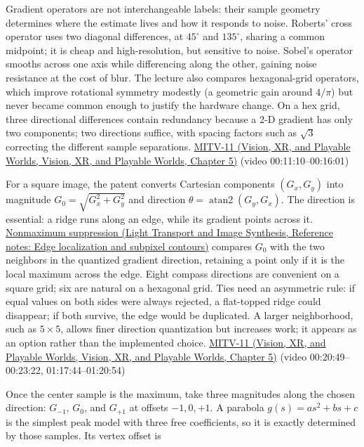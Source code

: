 Gradient operators are not interchangeable labels: their sample geometry determines where the estimate lives and how it responds to noise. Roberts' cross operator uses two diagonal differences, at \(45^\circ\) and \(135^\circ\), sharing a common midpoint; it is cheap and high-resolution, but sensitive to noise. Sobel's operator smooths across one axis while differencing along the other, gaining noise resistance at the cost of blur. The lecture also compares hexagonal-grid operators, which improve rotational symmetry modestly (a geometric gain around \(4/\pi\)) but never became common enough to justify the hardware change. On a hex grid, three directional differences contain redundancy because a 2-D gradient has only two components; two directions suffice, with spacing factors such as \(\sqrt3\) correcting the different sample separations. \href{../07-Vision-XR-and-Playable-Worlds/main.pdf\#nameddest=04-visual-computing-ii-ch036-mitv-11---edge-detection-subpixel-position-cordic-line-detection-us-6408109}{MITV-11 (Vision, XR, and Playable Worlds, Vision, XR, and Playable Worlds, Chapter 5)} (video 00:11:10--00:16:01)

For a square image, the patent converts Cartesian components \((G_x,G_y)\) into magnitude \(G_0=\sqrt{G_x^2+G_y^2}\) and direction \(\theta=\operatorname{atan2}(G_y,G_x)\). The direction is essential: a ridge runs along an edge, while its gradient points across it. \href{../04-Light-Transport-and-Image-Synthesis/main.pdf\#nameddest=appendix-36022286b03e}{Nonmaximum suppression (Light Transport and Image Synthesis, Reference notes: Edge localization and subpixel contours)} compares \(G_0\) with the two neighbors in the quantized gradient direction, retaining a point only if it is the local maximum across the edge. Eight compass directions are convenient on a square grid; six are natural on a hexagonal grid. Ties need an asymmetric rule: if equal values on both sides were always rejected, a flat-topped ridge could disappear; if both survive, the edge would be duplicated. A larger neighborhood, such as \(5\times5\), allows finer direction quantization but increases work; it appears as an option rather than the implemented choice. \href{../07-Vision-XR-and-Playable-Worlds/main.pdf\#nameddest=04-visual-computing-ii-ch036-mitv-11---edge-detection-subpixel-position-cordic-line-detection-us-6408109}{MITV-11 (Vision, XR, and Playable Worlds, Vision, XR, and Playable Worlds, Chapter 5)} (video 00:20:49--00:23:22, 01:17:44--01:20:54)

Once the center sample is the maximum, take three magnitudes along the chosen direction: \(G_{-1}\), \(G_0\), and \(G_{+1}\) at offsets \(-1,0,+1\). A parabola \(g(s)=as^2+bs+c\) is the simplest peak model with three free coefficients, so it is exactly determined by those samples. Its vertex offset is

